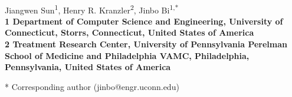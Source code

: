 \documentclass[10pt,letterpaper]{article}
\date{}
\begin{document}
\vspace*{0.35in}

\begin{flushleft}
{\Large
\textbf{}
}
\newline
\\
Jiangwen Sun\textsuperscript{1},
Henry R. Kranzler\textsuperscript{2},
Jinbo Bi\textsuperscript{1,*}
\\
\bigskip
\bf{1} Department of Computer Science and Engineering, University of Connecticut, Storrs, Connecticut, United States of America
\\
\bf{2} Treatment Research Center, University of Pennsylvania Perelman School of Medicine and Philadelphia VAMC, Philadelphia, Pennsylvania, United States of America
\\
\bigskip

% 
%

* Corresponding author (jinbo@engr.uconn.edu)

\end{flushleft}
\end{document}

